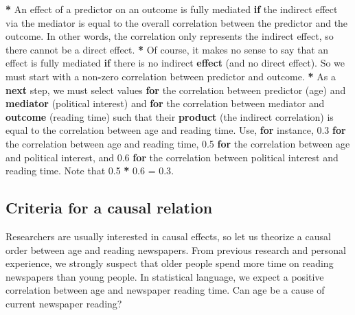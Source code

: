 \documentclass[a4paper]{book}
\newenvironment{Shaded}{\begin{snugshade}}{\end{snugshade}}
\newcommand{\KeywordTok}[1]{\textcolor[rgb]{0,0,0}{\textbf{#1}}}
\newcommand{\FloatTok}[1]{\textcolor[rgb]{0.00,0.00,0.00}{#1}}
\newcommand{\StringTok}[1]{\textcolor[rgb]{0.00,0.00,0.00}{#1}}
\newcommand{\ControlFlowTok}[1]{\textcolor[rgb]{0.00,0.00,0.00}{\textbf{#1}}}
\newcommand{\OperatorTok}[1]{\textcolor[rgb]{0.00,0.00,0.00}{\textbf{#1}}}
\newcommand{\NormalTok}[1]{#1}
\theoremstyle{definition}
\theoremstyle{definition}
\theoremstyle{definition}
\theoremstyle{remark}
\begin{document}
\begin{Shaded}
\begin{Highlighting}[]
\OperatorTok{*}\StringTok{ }\NormalTok{An effect of a predictor on an outcome is fully mediated }\ControlFlowTok{if}\NormalTok{ the indirect}
\NormalTok{effect via the mediator is equal to the overall correlation between the}
\NormalTok{predictor and the outcome. In other words, the correlation only represents the}
\NormalTok{indirect effect, so there cannot be a direct effect.}
\OperatorTok{*}\StringTok{ }\NormalTok{Of course, it makes no sense to say that an effect is fully mediated }\ControlFlowTok{if}
\NormalTok{there is no indirect }\KeywordTok{effect}\NormalTok{ (and no direct effect). So we must start with a}
\NormalTok{non}\OperatorTok{-}\NormalTok{zero correlation between predictor and outcome.}
\OperatorTok{*}\StringTok{ }\NormalTok{As a }\ControlFlowTok{next}\NormalTok{ step, we must select values }\ControlFlowTok{for}\NormalTok{ the correlation between predictor}
\NormalTok{(age) and }\KeywordTok{mediator}\NormalTok{ (political interest) and }\ControlFlowTok{for}\NormalTok{ the correlation between}
\NormalTok{mediator and }\KeywordTok{outcome}\NormalTok{ (reading time) such that their }\KeywordTok{product}\NormalTok{ (the indirect}
\NormalTok{correlation) is equal to the correlation between age and reading time. Use,}
\ControlFlowTok{for}\NormalTok{ instance, }\FloatTok{0.3} \ControlFlowTok{for}\NormalTok{ the correlation between age and reading time, }\FloatTok{0.5} \ControlFlowTok{for}\NormalTok{ the}
\NormalTok{correlation between age and political interest, and }\FloatTok{0.6} \ControlFlowTok{for}\NormalTok{ the correlation}
\NormalTok{between political interest and reading time. Note that }\FloatTok{0.5} \OperatorTok{*}\StringTok{ }\FloatTok{0.6}\NormalTok{ =}\StringTok{ }\FloatTok{0.3}\NormalTok{.}
\end{Highlighting}
\end{Shaded}

\subsection{Criteria for a causal relation}\label{causalcriteria}

Researchers are usually interested in causal effects, so let us theorize
a causal order between age and reading newspapers. From previous
research and personal experience, we strongly suspect that older people
spend more time on reading newspapers than young people. In statistical
language, we expect a positive correlation between age and newspaper
reading time. Can age be a cause of current newspaper reading?
\end{document}
